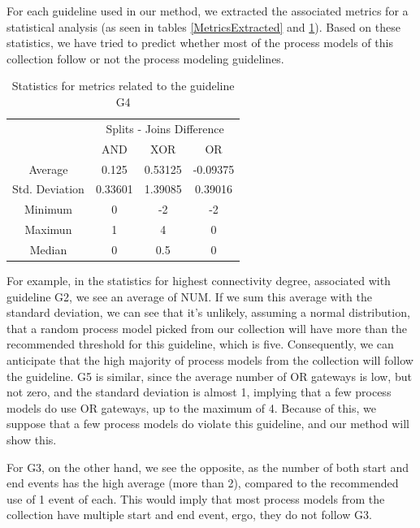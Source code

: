 \documentclass[a4paper,twoside]{article}
\begin{document}
For each guideline used in our method, we extracted the associated metrics for a statistical analysis (as seen in tables \ref{MetricsExtracted} and \ref{MetricsGateways}). Based on these statistics, we have tried to predict whether most of the process models of this collection follow or not the process modeling guidelines. 



\begin{table}[]
	\centering
	\caption{Statistics for metrics related to the guideline G4}
	\label{MetricsGateways}
	\begin{tabular}{|c|c|c|c|}
		\hline
		\multirow{2}{*}{}  & \multicolumn{3}{c|}{Splits - Joins Difference} \\ \cline{2-4} 
		& AND            & XOR           & OR            \\ \hline
		Average            & 0.125          & 0.53125       & -0.09375      \\ \hline
		Std. Deviation & 0.33601   & 1.39085   & 0.39016   \\ \hline
		Minimum            & 0              & -2            & -2            \\ \hline
		Maximun            & 1              & 4             & 0             \\ \hline
		Median             & 0              & 0.5           & 0             \\ \hline
	\end{tabular}
\end{table}

For example, in the statistics for highest connectivity degree, associated with guideline G2, we see an average of NUM. If we sum this average with the standard deviation, we can see that it's unlikely, assuming a normal distribution, that a random process model picked from our collection will have more than the recommended threshold for this guideline, which is five. Consequently, we can anticipate that the high majority of process models from the collection will follow the guideline. G5 is similar, since the average number of OR gateways is low, but not zero, and the standard deviation is almost 1, implying that a few process models do use OR gateways, up to the maximum of 4. Because of this, we suppose that a few process models do violate this guideline, and our method will show this.

For G3, on the other hand, we see the opposite, as the number of both start and end events has the high average (more than 2), compared to the recommended use of 1 event of each. This would imply that most process models from the collection have multiple start and end event, ergo, they do not follow G3. 
\end{document}
